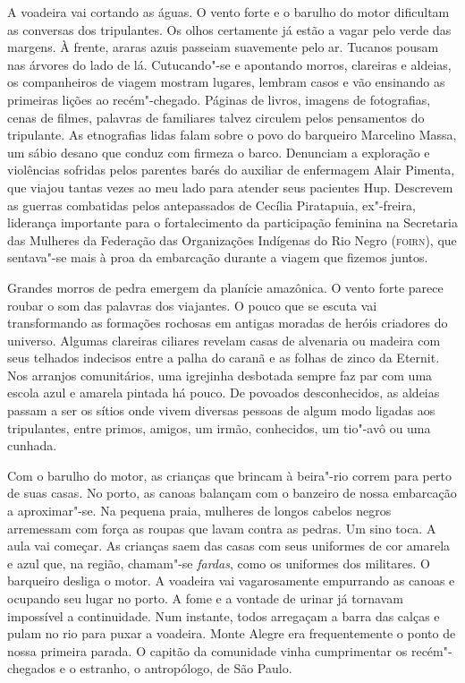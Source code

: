 A voadeira vai cortando as águas. O vento forte e o barulho do motor
dificultam as conversas dos tripulantes. Os olhos certamente já estão a
vagar pelo verde das margens. À frente, araras azuis passeiam suavemente
pelo ar. Tucanos pousam nas árvores do lado de lá. Cutucando"-se e
apontando morros, clareiras e aldeias, os companheiros de viagem mostram
lugares, lembram casos e vão ensinando as primeiras lições ao
recém"-chegado. Páginas de livros, imagens de fotografias, cenas de
filmes, palavras de familiares talvez circulem pelos pensamentos do
tripulante. As etnografias lidas falam sobre o povo do barqueiro
Marcelino Massa, um sábio desano que conduz com firmeza o barco.
Denunciam a exploração e violências sofridas pelos parentes barés do
auxiliar de enfermagem Alair Pimenta, que viajou tantas vezes ao meu
lado para atender seus pacientes Hup. Descrevem as guerras combatidas
pelos antepassados de Cecília Piratapuia, ex"-freira, liderança
importante para o fortalecimento da participação feminina na Secretaria
das Mulheres da Federação das Organizações Indígenas do Rio Negro
({\textsc{foirn}}), que sentava"-se mais à proa da embarcação durante a viagem que
fizemos juntos.

Grandes morros de pedra emergem da planície amazônica. O vento forte
parece roubar o som das palavras dos viajantes. O pouco que se escuta
vai transformando as formações rochosas em antigas moradas de heróis
criadores do universo. Algumas clareiras ciliares revelam casas de
alvenaria ou madeira com seus telhados indecisos entre a palha do caranã
e as folhas de zinco da Eternit. Nos arranjos comunitários, uma
igrejinha desbotada sempre faz par com uma escola azul e amarela pintada
há pouco. De povoados desconhecidos, as aldeias passam a ser os sítios
onde vivem diversas pessoas de algum modo ligadas aos tripulantes, entre
primos, amigos, um irmão, conhecidos, um tio"-avô ou uma cunhada.

Com o barulho do motor, as crianças que brincam à beira"-rio correm para
perto de suas casas. No porto, as canoas balançam com o banzeiro de
nossa embarcação a aproximar"-se. Na pequena praia, mulheres de longos
cabelos negros arremessam com força as roupas que lavam contra as
pedras. Um sino toca. A aula vai começar. As crianças saem das casas com
seus uniformes de cor amarela e azul que, na região, chamam"-se
\textit{fardas}, como os uniformes dos militares. O barqueiro desliga o
motor. A voadeira vai vagarosamente empurrando as canoas e ocupando seu
lugar no porto. A fome e a vontade de urinar já tornavam impossível a
continuidade. Num instante, todos arregaçam a barra das calças e pulam
no rio para puxar a voadeira. Monte Alegre era frequentemente o ponto de
nossa primeira parada. O capitão da comunidade vinha cumprimentar os
recém"-chegados e o estranho, o antropólogo, de São Paulo.

